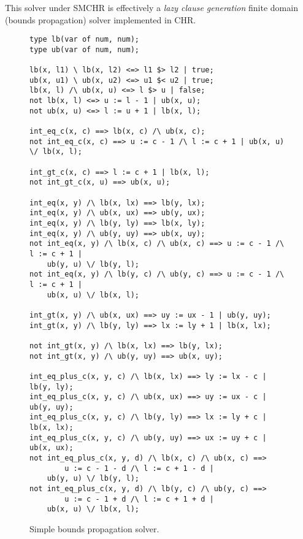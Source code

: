 \documentclass{article}
\begin{document}
This solver under SMCHR is effectively a
\emph{lazy clause generation} finite domain (bounds propagation) solver
implemented in CHR.

\begin{figure}
{
\small
\begin{verbatim}
type lb(var of num, num);
type ub(var of num, num);

lb(x, l1) \ lb(x, l2) <=> l1 $> l2 | true;
ub(x, u1) \ ub(x, u2) <=> u1 $< u2 | true;
lb(x, l) /\ ub(x, u) <=> l $> u | false;
not lb(x, l) <=> u := l - 1 | ub(x, u);
not ub(x, u) <=> l := u + 1 | lb(x, l);

int_eq_c(x, c) ==> lb(x, c) /\ ub(x, c);
not int_eq_c(x, c) ==> u := c - 1 /\ l := c + 1 | ub(x, u) \/ lb(x, l);

int_gt_c(x, c) ==> l := c + 1 | lb(x, l);
not int_gt_c(x, u) ==> ub(x, u);

int_eq(x, y) /\ lb(x, lx) ==> lb(y, lx);
int_eq(x, y) /\ ub(x, ux) ==> ub(y, ux);
int_eq(x, y) /\ lb(y, ly) ==> lb(x, ly);
int_eq(x, y) /\ ub(y, uy) ==> ub(x, uy);
not int_eq(x, y) /\ lb(x, c) /\ ub(x, c) ==> u := c - 1 /\ l := c + 1 |
    ub(y, u) \/ lb(y, l);
not int_eq(x, y) /\ lb(y, c) /\ ub(y, c) ==> u := c - 1 /\ l := c + 1 |
    ub(x, u) \/ lb(x, l);

int_gt(x, y) /\ ub(x, ux) ==> uy := ux - 1 | ub(y, uy);
int_gt(x, y) /\ lb(y, ly) ==> lx := ly + 1 | lb(x, lx);

not int_gt(x, y) /\ lb(x, lx) ==> lb(y, lx);
not int_gt(x, y) /\ ub(y, uy) ==> ub(x, uy);

int_eq_plus_c(x, y, c) /\ lb(x, lx) ==> ly := lx - c | lb(y, ly);
int_eq_plus_c(x, y, c) /\ ub(x, ux) ==> uy := ux - c | ub(y, uy);
int_eq_plus_c(x, y, c) /\ lb(y, ly) ==> lx := ly + c | lb(x, lx);
int_eq_plus_c(x, y, c) /\ ub(y, uy) ==> ux := uy + c | ub(x, ux);
not int_eq_plus_c(x, y, d) /\ lb(x, c) /\ ub(x, c) ==>
        u := c - 1 - d /\ l := c + 1 - d |
    ub(y, u) \/ lb(y, l);
not int_eq_plus_c(x, y, d) /\ lb(y, c) /\ ub(y, c) ==>
        u := c - 1 + d /\ l := c + 1 + d |
    ub(x, u) \/ lb(x, l);
\end{verbatim}
}
\caption{Simple bounds propagation solver.\label{fig:bounds}}
\end{figure}



\end{document}
